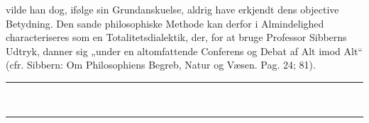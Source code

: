 \documentclass[12pt]{book}
\newcommand{\deel}[2]{%
  \par\vspace{1.2\baselineskip}%
  \noindent\rule{\linewidth}{1.2pt}\par\vspace{2pt}%
  \noindent\rule{\linewidth}{0.4pt}\par\vspace{0.9\baselineskip}%
  \begin{center}
    {\large\bfseries Den propædeutiske Logiks\par}\vspace{0.35\baselineskip}
    {\bfseries #1\par}\vspace{0.35\baselineskip}
    {\Large\bfseries\emph{#2}\par}
  \end{center}
  \vspace{0.45\baselineskip}
  \begin{center}\rule{0.20\linewidth}{0.4pt}\end{center}
  \vspace{0.45\baselineskip}
  \phantomsection
  \addcontentsline{toc}{section}{\texorpdfstring{#1\quad #2}{#1 #2}}%
  \markboth{#1\ #2}{#1\ #2}%
}
\newcommand{\divrule}{\begin{center}%
  \rule{0.27\linewidth}{0.9pt}\\[1.6pt]\rule{0.22\linewidth}{0.4pt}\end{center}}
\newcommand{\secrule}{\begin{center}%
  \rule{0.20\linewidth}{0.4pt}\\[1.3pt]\rule{0.20\linewidth}{0.4pt}\end{center}}
\begin{document}
vilde han dog, ifølge sin Grundanskuelse, aldrig have erkjendt dens objective
Betydning. Den sande philosophiske Methode kan derfor i Almindelighed characteriseres
som en Totalitetsdialektik, der, for at bruge Professor Sibberns Udtryk, danner sig
„under en altomfattende Conferens og Debat af Alt imod Alt“ (cfr. Sibbern: Om
Philosophiens Begreb, Natur og Væsen. Pag. 24; 81).

\divrule

\end{document}

